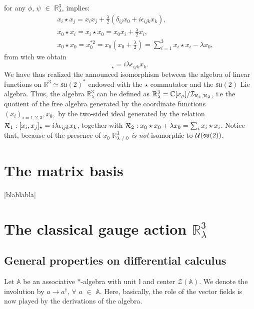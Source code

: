 \documentclass[a4paper,11pt]{article} %
\numberwithin{equation}{section} %
\numberwithin{figure}{section} %
\theoremstyle{plain} %
\theoremstyle{definition} %
\theoremstyle{remark} %
\begin{document}
for any $\phi$, $\psi$ $\in$ $\mathbb{R}^{3}_{\lambda}$, implies:
\begin{eqnarray*}
 && x_i \star x_j = x_i x_j + \frac{\lambda}{2} ( \delta_{ij} x_0 + i \epsilon_{ijk} x_k ),\\
 && x_0 \star x_i = x_i \star x_0 = x_0 x_i + \frac{\lambda}{2} x_i  ,\\
 && x_0 \star x_0 = x_{0}^{*2} = x_0 ( x_0 + \frac{\lambda}{2} ) = \sum_{i=1}^{3} x_i \star x_i - \lambda x_0,
\end{eqnarray*}
from wich we obtain
\begin{equation*}
 [x_i , x_j ]_{\star} = i \lambda \epsilon_{ijk} x_{k}.
\end{equation*}
We have thus realized the announced isomorphism between the algebra of linear functions on $\mathbb{R}^3\simeq \mathfrak{su}(2)^*$ endowed with the $\star$ commutator and the $\mathfrak{su}(2)$ Lie algebra. Thus, the algebra $\mathbb{R}^3_\lambda$ can be defined as $\mathbb{R}^3_\lambda=\mathbb{C}[x_\mu]/{\cal{I}}_{{\cal{R}}_1,{\cal{R}}_2 }$, i.e the quotient of the free algebra generated by the coordinate functions $(x_i)_{i=1,2,3}, x_0,$ by the two-sided ideal generated by the relation ${\cal{R}}_1: [x_i,x_j]_\star=i\lambda\epsilon_{ijk}x_k$, together with ${\cal{R}}_2: x_0\star x_0 +\lambda x_0 =\sum_i x_i\star x_i$. Notice that, because of the presence of $x_0$ $\mathbb{R}^3_{\lambda\ne 0}$ {\it is not} isomorphic to  $ {\cal{U}}(\mathfrak{su}(2))$.

\section{The matrix basis}

[blablabla]

\section{The classical gauge action $\mathbb{R}^{3}_{\lambda}$}

\subsection*{General properties on differential calculus}

\noindent
Let $\mathbb{A}$ be an associative $*$-algebra with unit $\mathbb{I}$ and center $\mathcal{Z}(\mathbb{A})$. We denote the involution by $a \rightarrow a^{\dagger}$, $\forall$ $a$ $\in$ $\mathbb{A}$. Here, basically, the role of the vector fields is now played by the derivations of the algebra. 
\end{document}
